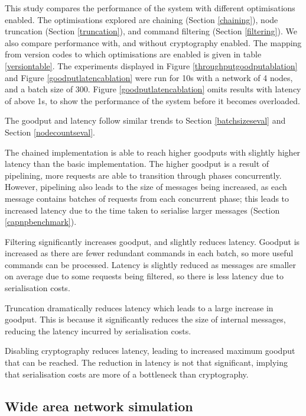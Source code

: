 This study compares the performance of the system with different optimisations enabled. The optimisations explored are chaining (Section \ref{chaining}), node truncation (Section \ref{truncation}), and command filtering (Section \ref{filtering}). We also compare performance with, and without cryptography enabled. The mapping from version codes to which optimisations are enabled is given in table \ref{versiontable}. The experiments displayed in Figure \ref{throughputgoodputablation} and Figure \ref{goodputlatencablation} were run for 10s with a network of 4 nodes, and a batch size of 300. Figure \ref{goodputlatencablation} omits results with latency of above 1s, to show the performance of the system before it becomes overloaded.

The goodput and latency follow similar trends to Section \ref{batchsizeseval} and Section \ref{nodecountseval}.

The chained implementation is able to reach higher goodputs with slightly higher latency than the basic implementation. The higher goodput is a result of pipelining, more requests are able to transition through phases concurrently. However, pipelining also leads to the size of messages being increased, as each message contains batches of requests from each concurrent phase; this leads to increased latency due to the time taken to serialise larger messages (Section \ref{capnpbenchmark}).

Filtering significantly increases goodput, and slightly reduces latency. Goodput is increased as there are fewer redundant commands in each batch, so more useful commands can be processed. Latency is slightly reduced as messages are smaller on average due to some requests being filtered, so there is less latency due to serialisation costs.

Truncation dramatically reduces latency which leads to a large increase in goodput. This is because it significantly reduces the size of internal messages, reducing the latency incurred by serialisation costs.

Disabling cryptography reduces latency, leading to increased maximum goodput that can be reached. The reduction in latency is not that significant, implying that serialisation costs are more of a bottleneck than cryptography.

\subsection{Wide area network simulation} \label{minineteval}

